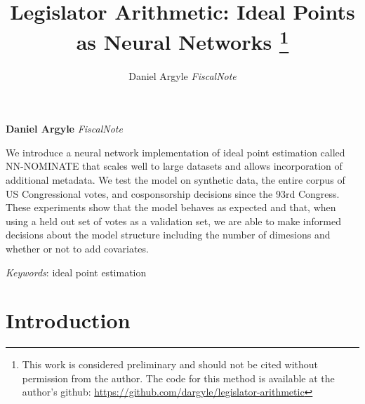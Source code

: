 \documentclass[11pt,]{article}
\title{Legislator Arithmetic: Ideal Points as Neural Networks \thanks{This work is considered preliminary and should not be cited without
permission from the author. The code for this method is available at the
author's github: \url{https://github.com/dargyle/legislator-arithmetic}}  }
\author{\Large Daniel Argyle\vspace{0.05in} \newline\normalsize\emph{FiscalNote}  }
\date{}
\newcommand*{\authorfont}{\fontfamily{phv}\selectfont}
\renewenvironment{abstract}
 {{%
    \setlength{\leftmargin}{0mm}
    \setlength{\rightmargin}{\leftmargin}%
  }%
  \relax}
 {\endlist}
\begin{document}
%

{%
\setlength{\parindent}{0pt}
\thispagestyle{plain}
{\fontsize{18}{20}\selectfont\raggedright
\maketitle  %

}

{
   \vskip 13.5pt\relax \normalsize\fontsize{11}{12}
\textbf{\authorfont Daniel Argyle} \hskip 15pt \emph{\small FiscalNote}

}

}








\begin{abstract}

    \hbox{\vrule height .2pt width 39.14pc}

    \vskip 8.5pt %

\noindent We introduce a neural network implementation of ideal point estimation
called NN-NOMINATE that scales well to large datasets and allows
incorporation of additional metadata. We test the model on synthetic
data, the entire corpus of US Congressional votes, and cosponsorship
decisions since the 93rd Congress. These experiments show that the model
behaves as expected and that, when using a held out set of votes as a
validation set, we are able to make informed decisions about the model
structure including the number of dimesions and whether or not to add
covariates.


\vskip 8.5pt \noindent \emph{Keywords}: ideal point estimation \par

    \hbox{\vrule height .2pt width 39.14pc}



\end{abstract}


\vskip 6.5pt


\noindent  \section{Introduction}\label{introduction}
\end{document}
